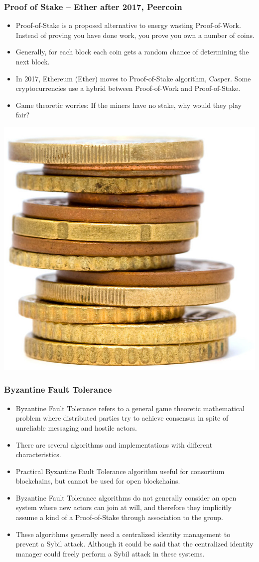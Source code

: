 \documentclass[8pt]{beamer}
\begin{document}
\begin{frame}
\frametitle{Proof of Stake – Ether after 2017, Peercoin}

\begin{itemize}
 \item Proof-of-Stake is a proposed alternative to energy wasting Proof-of-Work. Instead of proving you have done work, you prove you own a number of coins.
 \item Generally, for each block each coin gets a random chance of determining the next block.
 \item In 2017, Ethereum (Ether) moves to Proof-of-Stake algorithm, Casper. Some cryptocurrencies use a hybrid between Proof-of-Work and Proof-of-Stake.
 \item Game theoretic worries: If the miners have no stake, why would they play fair?
\end{itemize}
 \centering
 \includegraphics[width=4.5 cm,keepaspectratio=true]{./blockchain_images/coins.jpg}

\end{frame}

\begin{frame}
\frametitle{Byzantine Fault Tolerance}
\begin{itemize}
 \item Byzantine Fault Tolerance refers to a general game theoretic mathematical problem where distributed parties try to achieve consensus in spite of unreliable messaging and hostile actors.
 \item There are several algorithms and implementations with different characteristics.
 \item Practical Byzantine Fault Tolerance algorithm useful for consortium blockchains, but cannot be used for open blockchains.
 \item Byzantine Fault Tolerance algorithms do not generally consider an open system where new actors can join at will, and therefore they implicitly assume a kind of a Proof-of-Stake through association to the group.
 \item These algorithms generally need a centralized identity management to prevent a Sybil attack. Although it could be said that the centralized identity manager could freely perform a Sybil attack in these systems.
\end{itemize}

\end{frame}
\end{document}
